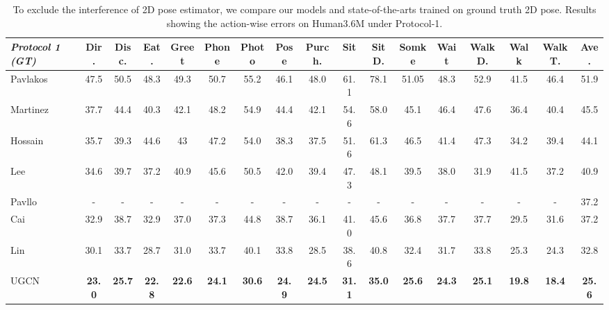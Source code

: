 \documentclass[runningheads]{llncs}
\begin{document}
\begin{table}[htb]
    \tiny
    \setlength{\tabcolsep}{0.25em}
    \centering
    \caption {To exclude the interference of 2D pose estimator, we compare our models and state-of-the-arts trained on ground truth 2D pose. Results showing the action-wise errors on Human3.6M under Protocol-1.}
    \label{tab: h35m sota gt}
    \begin{tabular}[width=0.9\linewidth]{@{}l| ccccccccccccccc |c   @{}}
    \toprule
    \textbf{\emph{Protocol 1 (GT)}} & Dir. & Disc. & Eat. & Greet   & Phone & Photo & Pose & Purch. & Sit   & SitD. & Somke & Wait & WalkD.  & Walk & WalkT. & Ave. \\
    \midrule
    Pavlakos~\cite{pavlakos2018ordinal} & 47.5& 50.5& 48.3& 49.3& 50.7& 55.2& 46.1& 48.0& 61.1& 78.1& 51.05& 48.3& 52.9& 41.5& 46.4& 51.9 \\
    Martinez~\cite{martinez2017simple} & 37.7& 44.4& 40.3& 42.1& 48.2& 54.9& 44.4& 42.1& 54.6& 58.0& 45.1& 46.4& 47.6& 36.4& 40.4& 45.5\\
    Hossain~\cite{rayat2018exploiting} & 35.7& 39.3& 44.6& 43& 47.2& 54.0& 38.3& 37.5& 51.6& 61.3& 46.5& 41.4& 47.3& 34.2& 39.4& 44.1 \\
    Lee~\cite{lee2018propagating} & 34.6& 39.7& 37.2& 40.9& 45.6& 50.5& 42.0& 39.4& 47.3& 48.1& 39.5& 38.0& 31.9& 41.5& 37.2& 40.9 \\
    Pavllo~\cite{pavllo20193d} & - &- & -& -& -& -& -& -& -& -& -&-& -& -&- & 37.2 \\
    Cai~\cite{cai2019exploiting} & 32.9& 38.7& 32.9& 37.0& 37.3& 44.8& 38.7& 36.1& 41.0& 45.6& 36.8& 37.7& 37.7& 29.5& 31.6& 37.2\\
    Lin~\cite{lin2019trajectory} & 30.1 & 33.7 & 28.7 & 31.0 & 33.7 & 40.1 & 33.8 & 28.5 & 38.6 & 40.8 & 32.4 & 31.7 & 33.8 & 25.3 & 24.3 & 32.8 \\
    \midrule
    UGCN & \textbf{23.0} & \textbf{25.7} & \textbf{22.8} & \textbf{22.6} & \textbf{24.1} & \textbf{30.6} & \textbf{24.9} & \textbf{24.5} & \textbf{31.1} & \textbf{35.0} & \textbf{25.6} & \textbf{24.3} & \textbf{25.1} & \textbf{19.8} & \textbf{18.4} & \textbf{25.6} \\
    \bottomrule
    \end{tabular}
\end{table}
\end{document}
